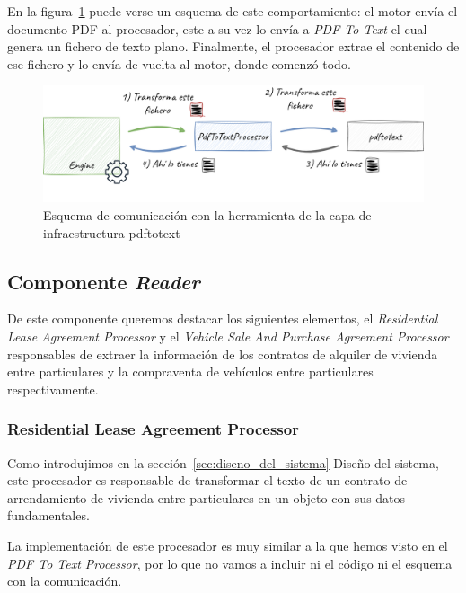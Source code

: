 En la figura~\ref{fig:chapter_4.4.generator_component_pdf_to_text_processor} puede verse un esquema de este
comportamiento: el motor envía el documento PDF al procesador, este a su vez lo envía a \textit{PDF To Text} el cual
genera un fichero de texto plano.
Finalmente, el procesador extrae el contenido de ese fichero y lo envía de vuelta al motor, donde comenzó todo.

\begin{figure}[ht]
    \begin{center}
        \includegraphics[width=\textwidth]{./chapter/4/images/chapter_4.4.generator_component_pdf_to_text_processor}
        \caption{Esquema de comunicación con la herramienta de la capa de infraestructura pdftotext}
        \label{fig:chapter_4.4.generator_component_pdf_to_text_processor}
    \end{center}
\end{figure}

\subsection*{Componente \textit{Reader}}

De este componente queremos destacar los siguientes elementos, el \textit{Residential Lease Agreement Processor} y el
\textit{Vehicle Sale And Purchase Agreement Processor} responsables de extraer la información de los contratos de
alquiler de vivienda entre particulares y la compraventa de vehículos entre particulares respectivamente.

\subsubsection*{Residential Lease Agreement Processor}

Como introdujimos en la sección~\ref{sec:diseno_del_sistema} Diseño del sistema, este procesador es responsable de
transformar el texto de un contrato de arrendamiento de vivienda entre particulares en un objeto con sus datos
fundamentales.

La implementación de este procesador es muy similar a la que hemos visto en el \textit{PDF To Text Processor}, por lo
que no vamos a incluir ni el código ni el esquema con la comunicación.


